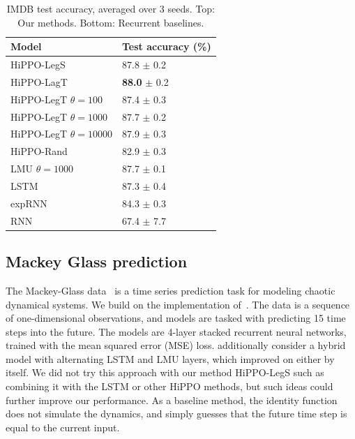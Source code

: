 \documentclass[../hippo.tex]{subfiles}
\begin{document}
\begin{table}
    \centering
    \begin{tabular}{@{}ll@{}}
      \toprule
      Model                  & Test accuracy (\%) \\
      \midrule
      HiPPO-LegS             & 87.8 $\pm$ 0.2 \\
      HiPPO-LagT         & \textbf{88.0} $\pm$ 0.2 \\
      HiPPO-LegT $\theta = 100$   & 87.4 $\pm$ 0.3 \\
      HiPPO-LegT $\theta = 1000$  & 87.7 $\pm$ 0.2 \\
      HiPPO-LegT $\theta = 10000$ & 87.9 $\pm$ 0.3 \\
      HiPPO-Rand             & 82.9 $\pm$ 0.3 \\ \midrule
      LMU $\theta = 1000$         & 87.7 $\pm$ 0.1 \\
      LSTM                   & 87.3 $\pm$ 0.4 \\
      expRNN                 & 84.3 $\pm$ 0.3 \\
      RNN                    & 67.4 $\pm$ 7.7 \\
      \bottomrule
    \end{tabular}
    \caption{IMDB test accuracy, averaged over 3 seeds. Top: Our methods.
      Bottom: Recurrent baselines.}
    \label{tab:imdb_test_acc}
\end{table}

\subsection{Mackey Glass prediction}
\label{sec:mackey}


The Mackey-Glass data~\citep{mackey1977oscillation}
is a time series prediction task for modeling chaotic dynamical systems.
We build on the implementation of~\citet{voelker2019legendre}.
The data is a sequence of one-dimensional observations,
and models are tasked with predicting 15 time steps into the future.
The models are 4-layer stacked recurrent neural networks, trained with the mean squared error (MSE) loss.
\citet{voelker2019legendre} additionally consider a hybrid model with alternating LSTM and LMU layers,
which improved on either by itself.
We did not try this approach with our method HiPPO-LegS such as combining it with the LSTM or other HiPPO methods,
but such ideas could further improve our performance.
As a baseline method, the identity function does not simulate the dynamics,
and simply guesses that the future time step is equal to the current input.
\end{document}
